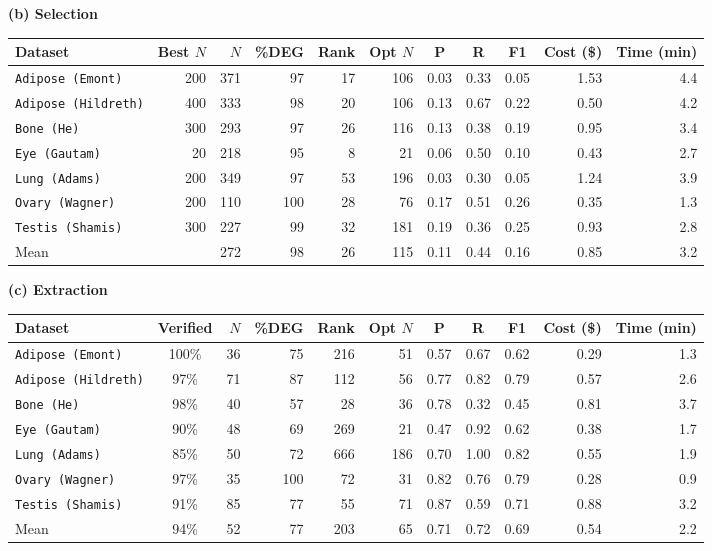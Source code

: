 \documentclass[10pt,twocolumn]{article}
\theoremstyle{plain}
\theoremstyle{definition}
\theoremstyle{remark}
\begin{document}
\begin{table}[ht!]
  \vspace{8pt}
  \textbf{(b) Selection}
  \vspace{2pt}

  \begin{tabular}{@{}l r r rrr ccc r r@{}}
  \toprule
  Dataset & Best $N$ & $N$ & \%DEG & Rank & Opt $N$ & P & R & F1 & Cost (\$) & Time (min) \\
  \midrule
  \texttt{Adipose (Emont)}    & 200 & 371 &  97 & 17 & 106 & 0.03 & 0.33 & 0.05 & 1.53 &  4.4 \\
  \texttt{Adipose (Hildreth)} & 400 & 333 &  98 & 20 & 106 & 0.13 & 0.67 & 0.22 & 0.50 &  4.2 \\
  \texttt{Bone (He)}          & 300 & 293 &  97 & 26 & 116 & 0.13 & 0.38 & 0.19 & 0.95 &  3.4 \\
  \texttt{Eye (Gautam)}       &  20 & 218 &  95 &  8 &  21 & 0.06 & 0.50 & 0.10 & 0.43 &  2.7 \\
  \texttt{Lung (Adams)}       & 200 & 349 &  97 & 53 & 196 & 0.03 & 0.30 & 0.05 & 1.24 &  3.9 \\
  \texttt{Ovary (Wagner)}     & 200 & 110 & 100 & 28 &  76 & 0.17 & 0.51 & 0.26 & 0.35 &  1.3 \\
  \texttt{Testis (Shamis)}    & 300 & 227 &  99 & 32 & 181 & 0.19 & 0.36 & 0.25 & 0.93 &  2.8 \\
  \midrule
  Mean               &     & 272 &  98 & 26 & 115 & 0.11 & 0.44 & 0.16 & 0.85 &  3.2 \\
  \bottomrule
  \end{tabular}

  \vspace{8pt}
  \textbf{(c) Extraction}
  \vspace{2pt}

  \begin{tabular}{@{}l c r rrr ccc r r@{}}
  \toprule
  Dataset & Verified & $N$ & \%DEG & Rank & Opt $N$ & P & R & F1 & Cost (\$) & Time (min) \\
  \midrule
  \texttt{Adipose (Emont)}    & 100\% &  36 &  75 & 216 &  51 & 0.57 & 0.67 & 0.62 & 0.29 & 1.3 \\
  \texttt{Adipose (Hildreth)} &  97\% &  71 &  87 & 112 &  56 & 0.77 & 0.82 & 0.79 & 0.57 & 2.6 \\
  \texttt{Bone (He)}          &  98\% &  40 &  57 &  28 &  36 & 0.78 & 0.32 & 0.45 & 0.81 & 3.7 \\
  \texttt{Eye (Gautam)}       &  90\% &  48 &  69 & 269 &  21 & 0.47 & 0.92 & 0.62 & 0.38 & 1.7 \\
  \texttt{Lung (Adams)}       &  85\% &  50 &  72 & 666 & 186 & 0.70 & 1.00 & 0.82 & 0.55 & 1.9 \\
  \texttt{Ovary (Wagner)}     &  97\% &  35 & 100 &  72 &  31 & 0.82 & 0.76 & 0.79 & 0.28 & 0.9 \\
  \texttt{Testis (Shamis)}    &  91\% &  85 &  77 &  55 &  71 & 0.87 & 0.59 & 0.71 & 0.88 & 3.2 \\
  \midrule
  Mean               &  94\% &  52 & 77 & 203 & 65 & 0.71 & 0.72 & 0.69 & 0.54 &  2.2 \\
  \bottomrule
  \end{tabular}
\end{table}
\end{document}
